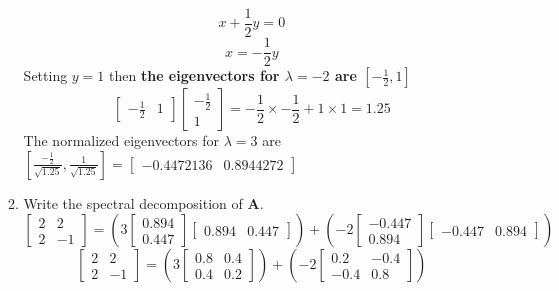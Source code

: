\documentclass[12pt,a4paper]{paper}
\begin{document}
\begin{enumerate}
\begin{enumerate}
\begin{multicols}{2}
\begin{equation}
\end{equation}
\begin{equation}
x+\frac{1}{2}y=0
\end{equation}
\begin{equation}
x=-\frac{1}{2}y
\end{equation}
Setting $y = 1$ then \textbf{the eigenvectors for $\lambda = -2$ are $\left[-\frac{1}{2}, 1\right]$}
\begin{equation}
\left[\begin{array}{cc}-\frac{1}{2} & 1\end{array}\right] \left[\begin{array}{c}-\frac{1}{2} \\ 1\end{array}\right] = -\frac{1}{2} \times -\frac{1}{2} + 1 \times 1 = 1.25
\end{equation}
The normalized eigenvectors for $\lambda = 3$ are $\left[\frac{-\frac{1}{2}}{\sqrt{1.25}}, \frac{1}{\sqrt{1.25}}\right] = \left[\begin{array}{cc}-0.4472136 & 0.8944272\end{array}\right]$
\end{multicols}
\item Write the spectral decomposition of \textbf{A}.
\begin{equation}
\left[\begin{array}{cc}2 & 2 \\ 2 & -1\end{array}\right] = \left(3 \left[\begin{array}{c}0.894 \\ 0.447\end{array}\right]\left[\begin{array}{cc}0.894 & 0.447\end{array}\right]\right) + \left(-2 \left[\begin{array}{c}-0.447 \\ 0.894\end{array}\right]\left[\begin{array}{cc}-0.447 & 0.894\end{array}\right]\right)
\end{equation}
\begin{equation}
\left[\begin{array}{cc}2 & 2 \\ 2 & -1\end{array}\right] = \left(3 \left[\begin{array}{cc}0.8 & 0.4 \\ 0.4 & 0.2\end{array}\right]\right) + \left(-2 \left[\begin{array}{cc}0.2 & -0.4 \\ -0.4 & 0.8\end{array}\right]\right)

\end{equation}
\end{enumerate}
\end{enumerate}
\end{document}
